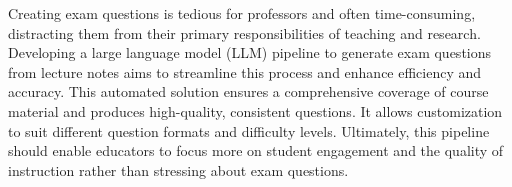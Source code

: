 

{
	Creating exam questions is tedious for professors and often time-consuming, distracting them from their primary responsibilities of teaching and research. Developing a large language model (LLM) pipeline to generate exam questions from lecture notes aims to streamline this process and enhance efficiency and accuracy. This automated solution ensures a comprehensive coverage of course material and produces high-quality, consistent questions. It allows customization to suit different question formats and difficulty levels. Ultimately, this pipeline should enable educators to focus more on student engagement and the quality of instruction rather than stressing about exam questions.
	\vspace*{-1.2cm}
}

